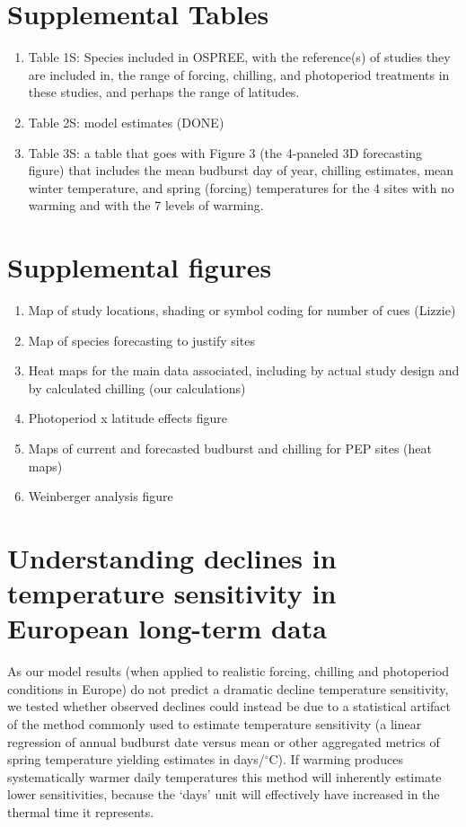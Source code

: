 \documentclass{article}
\begin{document}
\section*{Supplemental Tables}
\begin{enumerate}
\item Table 1S: Species included in OSPREE, with the reference(s) of studies they are included in, the range of forcing, chilling, and photoperiod treatments in these studies, and perhaps the range of latitudes.
\item Table 2S: model estimates (DONE)
\item Table 3S: a table that goes with Figure 3 (the 4-paneled 3D forecasting figure) that includes the mean budburst day of year, chilling estimates, mean winter temperature, and spring (forcing) temperatures for the 4 sites with no warming and with the 7 levels of warming.
\end{enumerate}
\section*{Supplemental figures}
\begin{enumerate}
\item Map of study locations, shading or symbol coding for number of cues (Lizzie)
\item Map of species forecasting to justify sites
\item Heat maps for the main data associated, including by actual study design and by calculated chilling (our calculations)
\item Photoperiod x latitude effects figure
\item Maps of current and forecasted budburst and chilling for PEP sites (heat maps)
\item Weinberger analysis figure


\end{enumerate}


\section*{Understanding declines in temperature sensitivity in European long-term data}
As our model results (when applied to realistic forcing, chilling and photoperiod conditions in Europe) do not predict a dramatic decline temperature sensitivity, we tested whether observed declines could instead be due to a statistical artifact of the method commonly used to estimate temperature sensitivity (a linear regression of annual budburst date versus mean or other aggregated metrics of spring temperature yielding estimates in days/$^{\circ}$C). If warming produces systematically warmer daily temperatures this method will inherently estimate lower sensitivities, because the `days' unit will effectively have increased in the thermal time it represents.
\end{document}
